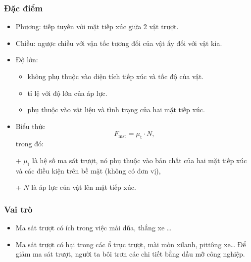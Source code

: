 \subsubsection{Đặc điểm}
\begin{itemize}
	\item Phương: tiếp tuyến với mặt tiếp xúc giữa 2 vật trượt.
	\item Chiều: ngược chiều với vận tốc tương đối của vật ấy đối với vật kia.
	\item Độ lớn:
		\begin{itemize}
			\item không phụ thuộc vào diện tích tiếp xúc và tốc độ của vật.
			\item tỉ lệ với độ lớn của áp lực.
			\item phụ thuộc vào vật liệu và tình trạng của hai mặt tiếp xúc.
		\end{itemize}
	\item Biểu thức 
	\begin{equation*}
		F_{\text{mst}} = \mu_{\text{t}} \cdot N,
	\end{equation*}
	trong đó:
	
	+ $\mu_{\text{t}}$ là hệ số ma sát trượt, nó phụ thuộc vào bản chất của hai mặt tiếp xúc và các điều kiện trên bề mặt (không có đơn vị),
	
	+ $N$ là áp lực của vật lên mặt tiếp xúc.
\end{itemize}
\subsubsection{Vai trò}
\begin{itemize}
	\item Ma sát trượt có ích trong việc mài dũa, thắng xe …
	\item Ma sát trượt có hại trong các ổ trục trượt, mài mòn xilanh, pittông xe… Để giảm ma sát trượt, người ta bôi trơn các chi tiết bằng dầu mỡ công nghiệp.
\end{itemize}
